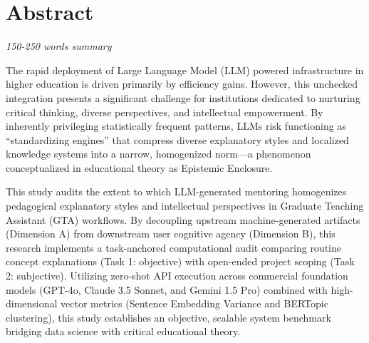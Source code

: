 
\chapter*{Abstract}

\textit{150-250 words summary}

The rapid deployment of Large Language Model (LLM) powered infrastructure in higher education is driven primarily by efficiency gains. However, this unchecked integration presents a significant challenge for institutions dedicated to nurturing critical thinking, diverse perspectives, and intellectual empowerment. By inherently privileging statistically frequent patterns, LLMs risk functioning as ``standardizing engines'' that compress diverse explanatory styles and localized knowledge systems into a narrow, homogenized norm—a phenomenon conceptualized in educational theory as Epistemic Enclosure. 

This study audits the extent to which LLM-generated mentoring homogenizes pedagogical explanatory styles and intellectual perspectives in Graduate Teaching Assistant (GTA) workflows. By decoupling upstream machine-generated artifacts (Dimension A) from downstream user cognitive agency (Dimension B), this research implements a task-anchored computational audit comparing routine concept explanations (Task 1: objective) with open-ended project scoping (Task 2: subjective). Utilizing zero-shot API execution across commercial foundation models (GPT-4o, Claude 3.5 Sonnet, and Gemini 1.5 Pro) combined with high-dimensional vector metrics (Sentence Embedding Variance and BERTopic clustering), this study establishes an objective, scalable system benchmark bridging data science with critical educational theory.

\newpage